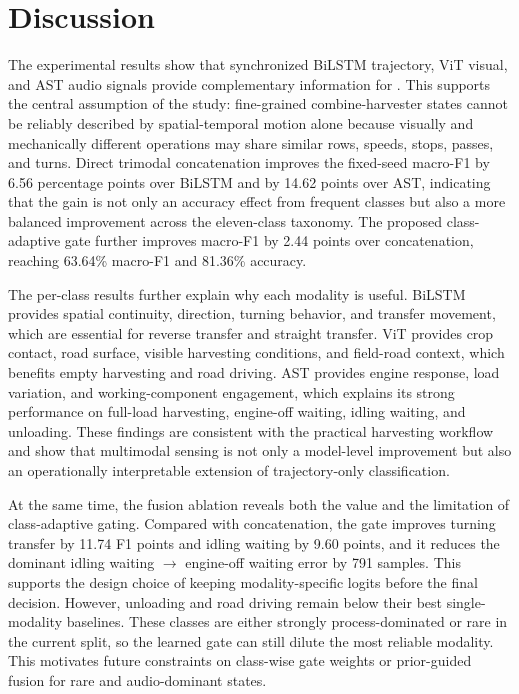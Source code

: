 \section{Discussion}
\label{sec:discussion}

The experimental results show that synchronized BiLSTM trajectory, ViT visual, and AST audio signals provide complementary information for \task{}. This supports the central assumption of the study: fine-grained combine-harvester states cannot be reliably described by spatial-temporal motion alone because visually and mechanically different operations may share similar rows, speeds, stops, passes, and turns. Direct trimodal concatenation improves the fixed-seed macro-F1 by 6.56 percentage points over BiLSTM and by 14.62 points over AST, indicating that the gain is not only an accuracy effect from frequent classes but also a more balanced improvement across the eleven-class taxonomy. The proposed class-adaptive gate further improves macro-F1 by 2.44 points over concatenation, reaching 63.64\% macro-F1 and 81.36\% accuracy.

The per-class results further explain why each modality is useful. BiLSTM provides spatial continuity, direction, turning behavior, and transfer movement, which are essential for reverse transfer and straight transfer. ViT provides crop contact, road surface, visible harvesting conditions, and field-road context, which benefits empty harvesting and road driving. AST provides engine response, load variation, and working-component engagement, which explains its strong performance on full-load harvesting, engine-off waiting, idling waiting, and unloading. These findings are consistent with the practical harvesting workflow and show that multimodal sensing is not only a model-level improvement but also an operationally interpretable extension of trajectory-only classification.

At the same time, the fusion ablation reveals both the value and the limitation of class-adaptive gating. Compared with concatenation, the gate improves turning transfer by 11.74 F1 points and idling waiting by 9.60 points, and it reduces the dominant idling waiting $\rightarrow$ engine-off waiting error by 791 samples. This supports the design choice of keeping modality-specific logits before the final decision. However, unloading and road driving remain below their best single-modality baselines. These classes are either strongly process-dominated or rare in the current split, so the learned gate can still dilute the most reliable modality. This motivates future constraints on class-wise gate weights or prior-guided fusion for rare and audio-dominant states.

